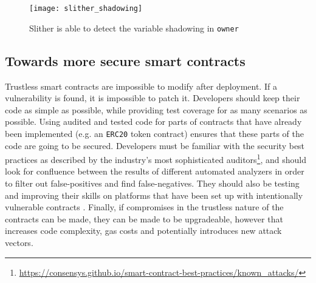 \begin{figure}[H]
    \centering
    \texttt{[image: slither\_shadowing]}
    \caption{Slither is able to detect the variable shadowing in \texttt{owner}}
    \label{fig:slither_shadowing}
\end{figure}

\subsection{Towards more secure smart contracts}

Trustless smart contracts are impossible to modify after deployment. If a vulnerability is found, it is impossible to patch it. Developers should keep their code as simple as possible, while providing test coverage for as many scenarios as possible. Using audited and tested code for parts of contracts that have already been implemented (e.g. an \texttt{ERC20} token contract) ensures that these parts of the code are going to be secured. Developers must be familiar with the security best practices as described by the industry's most sophisticated auditors\footnote{\url{https://consensys.github.io/smart-contract-best-practices/known_attacks/}}, and should look for confluence between the results of different automated analyzers in order to filter out false-positives and find false-negatives. They should also be testing and improving their skills on platforms that have been set up with intentionally vulnerable contracts \cite{ethernaut, hackthiscontract, capturetheether}. Finally, if compromises in the trustless nature of the contracts can be made, they can be made to be upgradeable, however that increases code complexity, gas costs and potentially introduces new attack vectors.